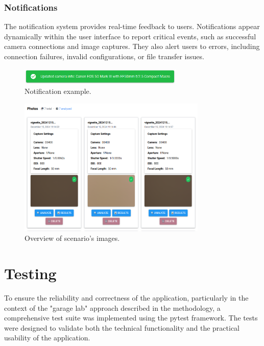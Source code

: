 \subsubsection{Notifications}
The notification system provides real-time feedback to users. Notifications appear dynamically within the user interface to report critical events, such as successful camera connections and image captures. They also alert users to errors, including connection failures, invalid configurations, or file transfer issues.

\begin{figure}[h]
\centering
\includegraphics[width=0.7\textwidth]{Images/notification.png}
\caption{Notification example.}
\label{fig:ui_notification}
\end{figure}

\begin{figure}[hbt]
\centering
\includegraphics[width=0.8\textwidth]{Images/scenario_photos.png}
\caption{Overview of scenario's images.}
\label{fig:ui_scenario_images}
\end{figure}

\section{Testing}

To ensure the reliability and correctness of the application, particularly in the context of the "garage lab" approach described in the methodology, a comprehensive test suite was implemented using the pytest framework. The tests were designed to validate both the technical functionality and the practical usability of the application.

